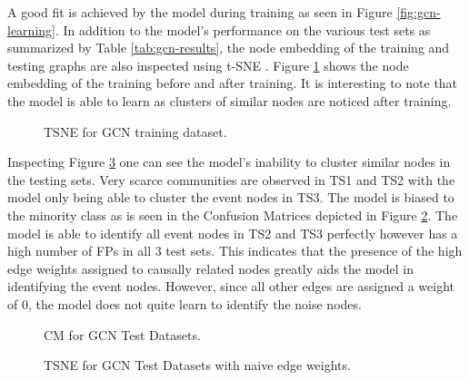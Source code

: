 A good fit is achieved by the model during training as seen in Figure
\ref{fig:gcn-learning}. In addition to the model's performance on the
various test sets as summarized by Table \ref{tab:gcn-results}, the
node embedding of the training and testing graphs are also inspected
using t-SNE \cite{maaten2008visualizing}. Figure
\ref{fig:gcn-train-tsne} shows the node embedding of the training
before and after training. It is interesting to note that the model is
able to learn as clusters of similar nodes are noticed after training.

\begin{figure}[htb]
  \centering
  \caption{TSNE for GCN training dataset.}
  \label{fig:gcn-train-tsne}
\end{figure}

Inspecting Figure \ref{fig:gcn-test-tsne} one can see the model's
inability to cluster similar nodes in the testing sets. Very scarce
communities are observed in TS1 and TS2 with the model only being able
to cluster the event nodes in TS3. The model is biased to the minority
class as is seen in the Confusion Matrices depicted in Figure
\ref{fig:gcn-cm}. The model is able to identify all event nodes in TS2 and
TS3 perfectly however has a high number of FPs in all 3 test sets.
This indicates that the presence of the high edge weights assigned to
causally related nodes greatly aids the model in identifying the event
nodes. However, since all other edges are assigned a weight of 0, the
model does not quite learn to identify the noise nodes.

\begin{figure}[htb]
  \centering
  \caption{CM for GCN Test Datasets.}
  \label{fig:gcn-cm}
\end{figure}

\begin{figure}[htb]
  \centering

  \caption{TSNE for GCN Test Datasets with naive edge weights.}
  \label{fig:gcn-test-tsne}
\end{figure}

